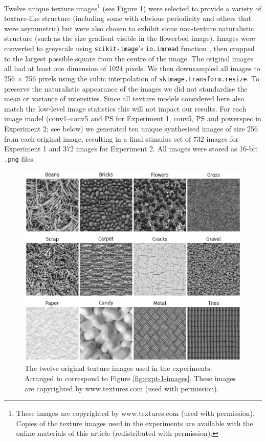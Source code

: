 \documentclass[article, 11pt,a4paper,natbib]{apa6}\usepackage[]{graphicx}\usepackage[]{color}
\begin{document}
Twelve unique texture images\footnote{
These images are copyrighted by www.textures.com (used with permission).
Copies of the texture images used in the experiments are available with the online materials of this article (redistributed with permission).
}
(see Figure \ref{fig:original_stimuli}) were selected to provide a variety of texture-like structure (including some with obvious periodicity and others that were asymmetric) but were also chosen to exhibit some non-texture naturalistic structure (such as the size gradient visible in the flowerbed image).
Images were converted to greyscale using \texttt{scikit-image}'s \texttt{io.imread} function \citep{vanderwalt_scikitimage_2014}, then cropped to the largest possible square from the centre of the image. 
The original images all had at least one dimension of 1024 pixels.
We then downsampled all images to 256 $\times$ 256 pixels using the cubic interpolation of \texttt{skimage.transform.resize}.
To preserve the naturalistic appearance of the images we did not standardise the mean or variance of intensities.
Since all texture models considered here also match the low-level image statistics this will not impact our results.
For each image model (conv1--conv5 and PS for Experiment 1, conv5, PS and powerspec in Experiment 2; see below) we generated ten unique synthesised images of size 256 from each original image, resulting in a final stimulus set of 732 images for Experiment 1 and 372 images for Experiment 2.
All images were stored as 16-bit \texttt{.png} files.

\begin{figure}
\centering
\includegraphics[width=\textwidth]{texture_originals.pdf}
\caption{
The twelve original texture images used in the experiments.
Arranged to correspond to Figure \ref{fig:expt-1-images}.
These images are copyrighted by www.textures.com (used with permission).
}
\label{fig:original_stimuli}
\end{figure}
\end{document}
